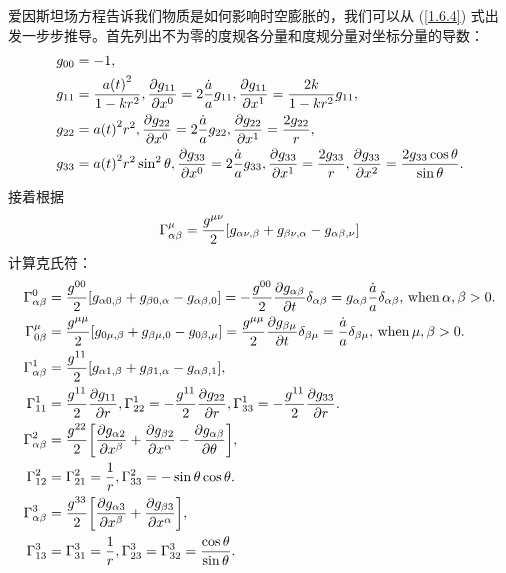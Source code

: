 \documentclass[../天体物理基础.tex]{subfiles}
\begin{document}
爱因斯坦场方程告诉我们物质是如何影响时空膨胀的，我们可以从 (\ref{1.6.4}) 式出发一步步推导。首先列出不为零的度规各分量和度规分量对坐标分量的导数：
\begin{align}
g_{00}&=-1,\notag\\
g_{11}&=\frac{a\mleft(t\mright)^{2}}{1-kr^{2}},\frac{\partial{}g_{11}}{\partial{}x^{0}}=2\frac{\dot a}{a}g_{11},\frac{\partial{}g_{11}}{\partial{}x^{1}}=\frac{2k}{1-kr^{2}}g_{11},\notag\\
g_{22}&=a\mleft(t\mright)^{2}r^{2},\frac{\partial{}g_{22}}{\partial{}x^{0}}=2\frac{\dot a}{a}g_{22},\frac{\partial{}g_{22}}{\partial{}x^{1}}=\frac{2g_{22}}{r},\notag\\
g_{33}&=a\mleft(t\mright)^{2}r^{2}\sin^{2}{\theta},\frac{\partial{}g_{33}}{\partial{}x^{0}}=2\frac{\dot a}{a}g_{33},\frac{\partial{}g_{33}}{\partial{}x^{1}}=\frac{2g_{33}}{r},\frac{\partial{}g_{33}}{\partial{}x^{2}}=\frac{2g_{33}\cos{\theta}}{\sin{\theta}}.\notag
\end{align}
接着根据
\begin{equation}
\Gamma_{\alpha\beta}^{\mu}=\frac{g^{\mu\nu}}{2}\mleft[g_{\alpha\nu,\beta}+g_{\beta\nu,\alpha}-g_{\alpha\beta,\nu}\mright]
\end{equation}
计算克氏符：
\begin{align}
\Gamma_{\alpha\beta}^{0}&=\frac{g^{00}}{2}\mleft[g_{\alpha0,\beta}+g_{\beta0,\alpha}-g_{\alpha\beta, 0}\mright]=-\frac{g^{00}}{2}\frac{\partial{}g_{\alpha\beta}}{\partial{}t}\delta_{\alpha\beta}=g_{\alpha\beta}\frac{\dot a}{a}\delta_{\alpha\beta},\,\text{when}\,\alpha,\beta>0.\notag\\
\Gamma_{0\beta}^{\mu}&=\frac{g^{\mu\mu}}{2}\mleft[g_{0\mu,\beta}+g_{\beta\mu, 0}-g_{0\beta,\mu}\mright]=\frac{g^{\mu\mu}}{2}\frac{\partial{}g_{\beta\mu}}{\partial{}t}\delta_{\beta\mu}=\frac{\dot a}{a}\delta_{\beta\mu},\,\text{when}\,\mu,\beta>0.\notag\\
\Gamma_{\alpha\beta}^{1}&=\frac{g^{11}}{2}\mleft[g_{\alpha1,\beta}+g_{\beta1,\alpha}-g_{\alpha\beta, 1}\mright],\notag\\
\Gamma_{11}^{1}&=\frac{g^{11}}{2}\frac{\partial{}g_{11}}{\partial{}r},\Gamma_{22}^{1}=-\frac{g^{11}}{2}\frac{\partial{}g_{22}}{\partial{}r},\Gamma_{33}^{1}=-\frac{g^{11}}{2}\frac{\partial{}g_{33}}{\partial{}r}.\notag\\
\Gamma_{\alpha\beta}^{2}&=\frac{g^{22}}{2}\mleft[\frac{\partial{}g_{\alpha2}}{\partial{}x^{\beta}}+\frac{\partial{}g_{\beta2}}{\partial{}x^{\alpha}}-\frac{\partial{}g_{\alpha\beta}}{\partial\theta}\mright],\notag\\
\Gamma_{12}^{2}&=\Gamma_{21}^{2}=\frac{1}{r},\Gamma_{33}^{2}=-\sin{\theta}\cos{\theta}.\notag\\
\Gamma_{\alpha\beta}^{3}&=\frac{g^{33}}{2}\mleft[\frac{\partial{}g_{\alpha3}}{\partial{}x^{\beta}}+\frac{\partial{}g_{\beta3}}{\partial{}x^{\alpha}}\mright],\notag\\
\Gamma_{13}^{3}&=\Gamma_{31}^{3}=\frac{1}{r},\Gamma_{23}^{3}=\Gamma_{32}^{3}=\frac{\cos{\theta}}{\sin{\theta}}.\notag
\end{align}
\end{document}

